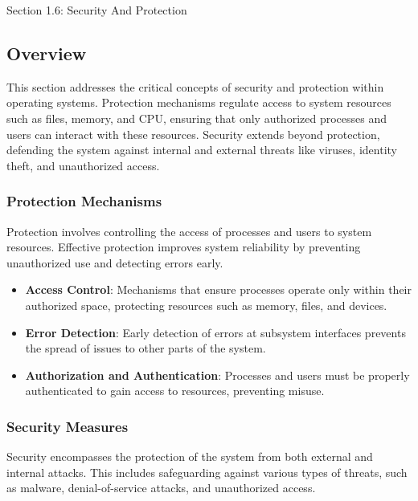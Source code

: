 \begin{notes}{Section 1.6: Security And Protection}
    \subsection*{Overview}

    This section addresses the critical concepts of security and protection within operating systems. Protection mechanisms regulate access to system resources such as files, memory, and CPU, ensuring 
    that only authorized processes and users can interact with these resources. Security extends beyond protection, defending the system against internal and external threats like viruses, identity 
    theft, and unauthorized access.
    
    \subsubsection*{Protection Mechanisms}
    
    Protection involves controlling the access of processes and users to system resources. Effective protection improves system reliability by preventing unauthorized use and detecting errors early.
    
    \begin{highlight}
    
    \begin{itemize}
        \item \textbf{Access Control}: Mechanisms that ensure processes operate only within their authorized space, protecting resources such as memory, files, and devices.
        \item \textbf{Error Detection}: Early detection of errors at subsystem interfaces prevents the spread of issues to other parts of the system.
        \item \textbf{Authorization and Authentication}: Processes and users must be properly authenticated to gain access to resources, preventing misuse.
    \end{itemize}
    
    \end{highlight}
    
    \subsubsection*{Security Measures}
    
    Security encompasses the protection of the system from both external and internal attacks. This includes safeguarding against various types of threats, such as malware, denial-of-service attacks, 
    and unauthorized access.
    

\end{notes}
